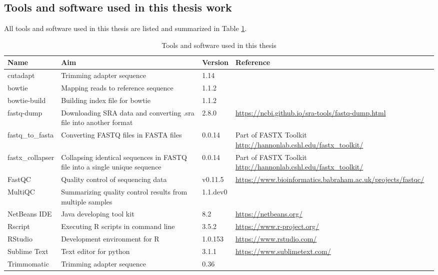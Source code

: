 \documentclass[]{uiophd}
\begin{document}
\subsection*{Tools and software used in this thesis work} 
All tools and software used in this thesis are listed and summarized in Table \ref{tab:usedTools}.
\begin{table}[h]
	\caption[Tools and software used in this thesis] {Tools and software used in this thesis} \label{tab:usedTools} 
	\begin{tabular}{| l | p{4cm} | l | p{4cm} | }
		\hline
		Name    & Aim & Version & Reference \\ \hline		
		cutadapt    & Trimming adapter sequence  & 1.14 &  \\
		bowtie    & Mapping reads to reference sequence & 1.1.2 & \\
		bowtie-build    & Building index file for bowtie & 1.1.2 &  \\
		fastq-dump    & Downloading SRA data and converting .sra file into another format & 2.8.0 & \url{https://ncbi.github.io/sra-tools/fastq-dump.html} \\
		fastq\_to\_fasta    & Converting FASTQ files in FASTA files &  0.0.14 & Part of FASTX Toolkit \url{http://hannonlab.cshl.edu/fastx_toolkit/}  \\
		fastx\_collapser    & Collapsing identical sequences in FASTQ file into a single unique sequence & 0.0.14 & Part of FASTX Toolkit \url{http://hannonlab.cshl.edu/fastx_toolkit/} \\
		FastQC    & Quality control of sequencing data & v0.11.5 & \url{https://www.bioinformatics.babraham.ac.uk/projects/fastqc/} \\
		MultiQC    & Summarizing quality control results from multiple samples & 1.1.dev0 &  \\
		NetBeans IDE    & Java developing tool kit & 8.2 & \url{https://netbeans.org/} \\
		Rscript    & Executing R scripts in command line & 3.5.2 & \url{https://www.r-project.org/} \\
		RStudio    & Development environment for R & 1.0.153 & \url{https://www.rstudio.com/} \\						
		Sublime Text    & Text editor for python & 3.1.1 & \url{https://www.sublimetext.com/} \\		
		Trimmomatic    & Trimming adapter sequence & 0.36 &  \\
		\hline
	\end{tabular}
\end{table}
\end{document}
